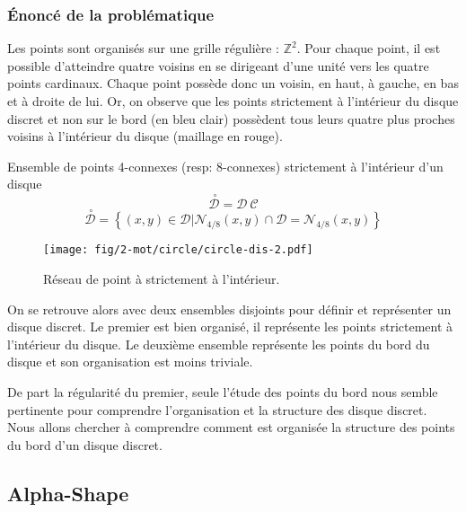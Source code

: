 \subsubsection{Énoncé de la problématique}

Les points sont organisés sur une grille régulière : $\mathbb{Z}^{2}$. Pour chaque point, il est possible d'atteindre quatre voisins en se dirigeant d'une unité vers les quatre points cardinaux. Chaque point possède donc un voisin, en haut, à gauche, en bas et à droite de lui. Or, on observe que les points strictement à l'intérieur du disque discret et non sur le bord (en bleu clair) possèdent tous leurs quatre plus proches voisins à l'intérieur du disque (maillage en rouge).

\begin{Definition}{Ensemble de points 4-connexes (resp: 8-connexes) strictement à l'intérieur d'un disque}
\label{def:int-ens}
  $$\stackrel{\ \circ}{\mathcal{D}} = \mathcal{D} \ \mathcal{C} $$
  $$ \stackrel{\ \circ}{\mathcal{D}} =  \left\{ (x,y) \in \mathcal{D} | \mathcal{N}_{4/8}(x,y) \cap \mathcal{D} = \mathcal{N}_{4/8}(x,y) \right\}$$
\end{Definition}

\begin{figure}[H]
  \centering
  \texttt{[image: fig/2-mot/circle/circle-dis-2.pdf]}
  \caption{Réseau de point à strictement à l'intérieur.}
\end{figure}

On se retrouve alors avec deux ensembles disjoints pour définir et représenter un disque discret. Le premier est bien organisé, il représente les points strictement à l'intérieur du disque. Le deuxième ensemble représente les points du bord du disque et son organisation est moins triviale. 

De part la régularité du premier, seule l'étude des points du bord nous semble pertinente pour comprendre l'organisation et la structure des disque discret.\\

Nous allons chercher à comprendre comment est organisée la structure des points du bord d'un disque discret.


\subsection{Alpha-Shape}

